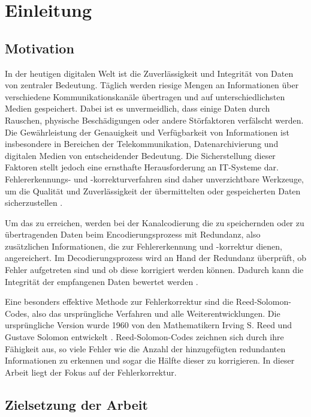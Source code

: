 \chapter{Einleitung}\label{ch:intro}

\section{Motivation}\label{sec:motivation}

In der heutigen digitalen Welt ist die Zuverlässigkeit und Integrität von Daten von zentraler Bedeutung. 
Täglich werden riesige Mengen an Informationen über verschiedene Kommunika\-tions\-kanäle übertragen und auf unterschiedlichsten Medien gespeichert. 
Dabei ist es unvermeidlich, dass einige Daten durch Rauschen, physische Beschädigungen oder andere Störfaktoren verfälscht werden. 
Die Gewährleistung der Genauigkeit und Verfügbarkeit von Informationen ist insbesondere in Bereichen der Telekommunikation, Datenarchivierung und digitalen Medien von entscheidender Bedeutung. 
Die Sicherstellung dieser Faktoren stellt jedoch eine ernsthafte Herausforderung an IT-Systeme dar. 
Fehlererkennungs- und -korrekturverfahren sind daher unverzichtbare Werkzeuge, um die Qualität und Zuverlässigkeit der übermittelten oder gespeicherten Daten sicherzustellen \cite[Kapitel 1]{petersonErrorcorrectingCodes1972}.

Um das zu erreichen, werden bei der Kanalcodierung die zu speichernden oder zu übertragenden Daten beim Encodierungsprozess mit Redundanz, also zusätzlichen Informationen, die zur Fehlererkennung und -korrektur dienen, angereichert. 
Im Decodierungsprozess wird an Hand der Redundanz überprüft, ob Fehler aufgetreten sind und ob diese korrigiert werden können. 
Dadurch kann die Integrität der empfangenen Daten bewertet werden \cite[Kapitel 1]{friedrichsKanalcodierung1996}.

Eine besonders effektive Methode zur Fehlerkorrektur sind die Reed-Solomon-Codes, also das ursprüngliche Verfahren und alle Weiterentwicklungen.
Die ursprüngliche Version wurde 1960 von den Mathematikern Irving S. Reed und Gustave Solomon entwickelt \cite{reedPolynomialCodesCertain1960}. 
Reed-Solomon-Codes zeichnen sich durch ihre Fähigkeit aus, so viele Fehler wie die Anzahl der hinzugefügten redundanten Informationen zu erkennen und sogar die Hälfte dieser zu korrigieren.
In dieser Arbeit liegt der Fokus auf der Fehlerkorrektur.

\section{Zielsetzung der Arbeit}\label{sec:objective}

